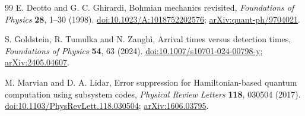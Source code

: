 \documentclass[11pt]{article}
\theoremstyle{definition}\newtheorem{assumption}[theorem]{Constitutive assumption}
\theoremstyle{remark}\newtheorem{remark}[theorem]{Remark}
\begin{document}
\begin{thebibliography}{99}
E. Deotto and G. C. Ghirardi,
Bohmian mechanics revisited,
\emph{Foundations of Physics} \textbf{28}, 1--30 (1998).
\href{https://doi.org/10.1023/A:1018752202576}{doi:10.1023/A:1018752202576};
\href{https://arxiv.org/abs/quant-ph/9704021}{arXiv:quant-ph/9704021}.

S. Goldstein, R. Tumulka and N. Zangh\`i,
Arrival times versus detection times,
\emph{Foundations of Physics} \textbf{54}, 63 (2024).
\href{https://doi.org/10.1007/s10701-024-00798-y}{doi:10.1007/s10701-024-00798-y};
\href{https://arxiv.org/abs/2405.04607}{arXiv:2405.04607}.

M. Marvian and D. A. Lidar,
Error suppression for Hamiltonian-based quantum computation using subsystem codes,
\emph{Physical Review Letters} \textbf{118}, 030504 (2017).
\href{https://doi.org/10.1103/PhysRevLett.118.030504}{doi:10.1103/PhysRevLett.118.030504};
\href{https://arxiv.org/abs/1606.03795}{arXiv:1606.03795}.

\end{thebibliography}
\end{document}
